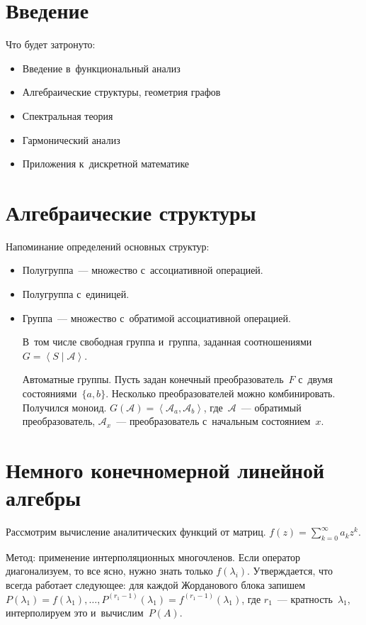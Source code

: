 \documentclass{article}
\begin{document}
\section{Введение}

Что будет затронуто:
\begin{itemize}
	\item Введение в~функциональный анализ
	\item Алгебраические структуры, геометрия графов
	\item Спектральная теория
	\item Гармонический анализ
	\item Приложения к~дискретной математике
\end{itemize}

\section{Алгебраические структуры}

\begin{definition} Напоминание определений основных структур:

\begin{itemize}
	\item Полугруппа~--- множество с~ассоциативной операцией.
	\item Полугруппа с~единицей.
	\item Группа~--- множество с~обратимой ассоциативной операцией.

		В~том числе свободная группа и~группа, заданная соотношениями $G =
		\left< S \mid \mathcal{A} \right>$.

		Автоматные группы. Пусть задан конечный преобразователь~$F$ с~двумя
		состояниями~$\{a, b\}$. Несколько преобразователей можно комбинировать.
		Получился моноид.
		$G(\mathcal{A}) = \left< \mathcal{A}_a, \mathcal{A}_b \right>$,
		где~$\mathcal{A}$~--- обратимый преобразователь, $\mathcal{A}_x$~---
		преобразователь с~начальным состоянием~$x$.
\end{itemize}
\end{definition}

\section{Немного конечномерной линейной алгебры}

Рассмотрим вычисление аналитических функций от матриц. $f(z) =
\sum\limits_{k=0}^\infty a_k z^k$.

Метод: применение интерполяционных многочленов. Если оператор диагонализуем,
то все ясно, нужно знать только $f(\lambda_i)$. Утверждается, что всегда
работает следующее: для каждой Жорданового блока запишем $P(\lambda_1) =
f(\lambda_1), \ldots, P^{(r_1 - 1)}(\lambda_1) = f^{(r_1 - 1)}(\lambda_1)$,
где $r_1$~--- кратность~$\lambda_1$, интерполируем это и~вычислим~$P(A)$.
\end{document}

